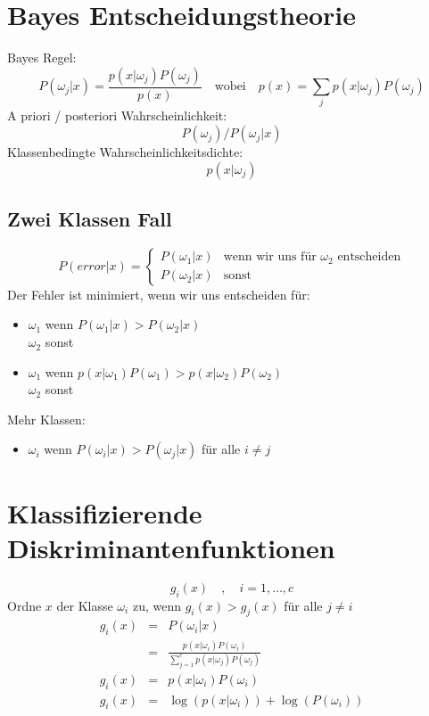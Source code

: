 \section{Bayes Entscheidungstheorie}

Bayes Regel: $$P(\omega_j | x) = \frac{p(x | \omega_j) P(\omega_j)}{p(x)} \quad \textrm{wobei} \quad p(x) = \sum\limits_{j} p(x | \omega_j) P(\omega_j)$$
A priori / posteriori Wahrscheinlichkeit: $$P(\omega_j) / P(\omega_j | x)$$
Klassenbedingte Wahrscheinlichkeitsdichte: $$p(x | \omega_j)$$

\subsection{Zwei Klassen Fall}

$$P(error | x) = \left\{ \begin{array}{cl} P(\omega_1 | x) & \textrm{wenn wir uns für } \omega_2 \textrm{ entscheiden} \\ P(\omega_2 | x) & \textrm{sonst} \end{array} \right.$$
Der Fehler ist minimiert, wenn wir uns entscheiden für:
\begin{itemize}
\item $\omega_1$ wenn $P(\omega_1 | x) > P(\omega_2 | x)$ \\ $\omega_2$ sonst
\item $\omega_1$ wenn $p(x | \omega_1)P(\omega_1) > p(x | \omega_2)P(\omega_2)$ \\ $\omega_2$ sonst
\end{itemize}
Mehr Klassen:
\begin{itemize}
\item $\omega_i$ wenn $P(\omega_i | x) > P(\omega_j | x)$ für alle $i \not= j$
\end{itemize}

\section{Klassifizierende Diskriminantenfunktionen}

$$g_i(x) \quad , \quad i = 1, \dots, c$$
Ordne $x$ der Klasse $\omega_i$ zu, wenn $g_i(x) > g_j(x)$ für alle $j \not= i$
\begin{eqnarray*}
g_i(x) &=& P(\omega_i | x) \\ &=& \frac{p(x | \omega_i) P(\omega_i)}{\sum\limits_{j=1}^c p(x | \omega_j)P(\omega_j)} \\ g_i(x) &=& p(x | \omega_i) P(\omega_i) \\
g_i(x) &=& \log(p(x | \omega_i)) + \log(P(\omega_i))
\end{eqnarray*}

